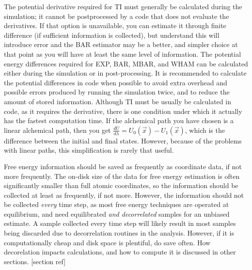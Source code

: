 \documentclass[9pt,bestpractices]{livecoms}
\begin{document}
The potential derivative required for TI must generally be calculated during the simulation; it cannot be postprocessed by a code that does not evaluate the derivatives. 
If that option is unavailable, you can estimate it through finite difference (if sufficient information is collected), but understand this will introduce error and the BAR estimator may be a better, and simpler choice at that point as you will have at least the same level of information. 
The potential energy differences required for EXP, BAR, MBAR, and WHAM can be calculated either during the simulation or in post-processing. It is recommended to calculate the potential differences in code when possible to avoid extra overhead and possible errors produced by running the simulation twice, and to reduce the amount of stored information. 
Although TI must be usually be calculated in code, as it requires the derivative, there is one condition under which it actually has the fastest computation time. 
If the alchemical path you have chosen is a linear alchemical path, then you get $\frac{dU}{d\lambda} = U_0(\vec{x}) - U_1(\vec{x})$, which is the difference between the initial and final states. 
However, because of the problems with linear paths, this simplification is rarely that useful.

Free energy information should be saved as frequently as coordinate data, if not more frequently. 
The on-disk size of the data for free energy estimation is often significantly smaller than full atomic coordinates, so the information should be collected at least as frequently, if not more. 
However, the information should not be collected \textit{every} time step, as most free energy techniques are operated at equilibrium, and need equilibrated \textit{and decorrelated} samples for an unbiased estimate.
A sample collected every time step will likely result in most samples being discarded due to decorrelation routines in the analysis. However, if it is computationally cheap and disk space is plentiful, do save often. 
How decorelation impacts calculations, and how to compute it is discussed in other sections. [section ref]
\end{document}
